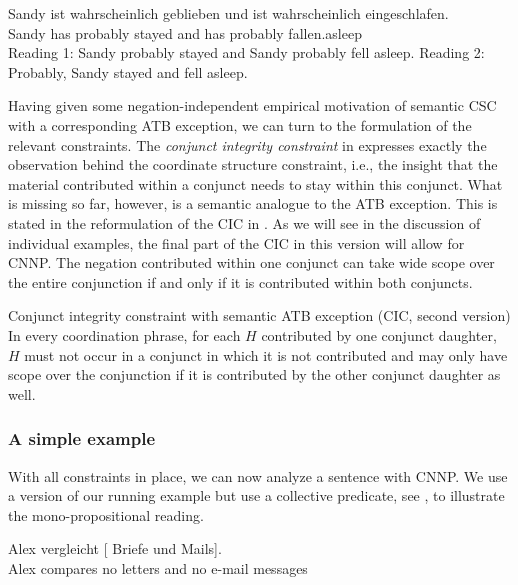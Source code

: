 \documentclass[output=paper]{langsci/langscibook}
\begin{document}
\ea \label{stay-asleep-ATB}
\gll Sandy ist wahrscheinlich geblieben und ist wahrscheinlich eingeschlafen.\\
Sandy has probably stayed and has probably fallen.asleep\\
\glt {}
\glt Reading 1: Sandy probably stayed and Sandy probably fell asleep.
\glt Reading 2: Probably, Sandy stayed and fell asleep.
\z 

Having given some negation-independent empirical motivation of semantic CSC with a corresponding ATB exception, we can turn to the formulation of the relevant constraints.
The \emph{conjunct integrity constraint} in 
expresses exactly the observation behind the coordinate structure constraint, i.e., the insight that the material contributed within a conjunct needs to stay within this conjunct. 
What is missing so far, however, is a semantic analogue to the ATB exception. %
This is stated in the reformulation of the CIC in .
As we will see in the discussion of individual examples, the final part of the CIC in this version will allow for CNNP. The negation contributed within one conjunct can take wide scope over the entire conjunction if and only if it is contributed within both conjuncts.


\ea 
Conjunct integrity constraint with semantic ATB exception (CIC, second version)\label{SemATB}\\

In every coordination phrase, 
for each $H$ contributed by one conjunct daughter, $H$ must not occur in a conjunct in which it is not contributed and may only have scope over the conjunction if 
it is contributed by the other conjunct daughter as well.

\z 

\subsubsection{A simple example}\label{Sec-AnalyisSimpleExample}\largerpage

With all constraints in place, we can now analyze a sentence with CNNP. We use a version of our running example but use a collective predicate, see , to illustrate the mono-propositional reading.

\ea \label{ex-brief-mail-ana}
\gll Alex vergleicht [ Briefe und  Mails].\\
Alex compares {\hphantom{[}no letters} and {no {e-mail messages}}\\
\z 
\end{document}
